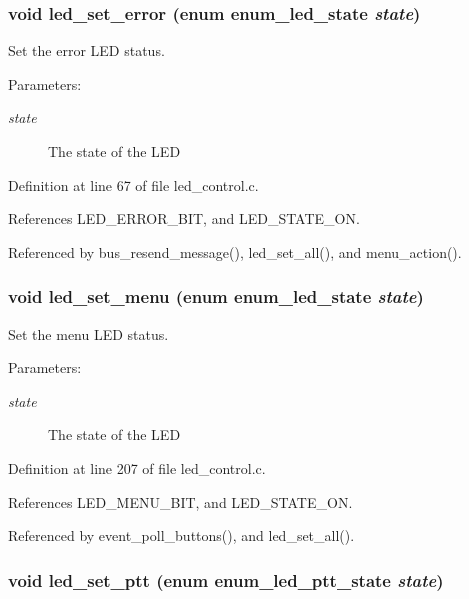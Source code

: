\subsubsection[{led\_\-set\_\-error}]{\setlength{\rightskip}{0pt plus 5cm}void led\_\-set\_\-error (enum {\bf enum\_\-led\_\-state} {\em state})}\label{led__control_8h_193a3938c3c5250e16f71f66d60dc5c7}


Set the error LED status. 

\begin{Desc}
\item[Parameters:]
\begin{description}
\item[{\em state}]The state of the LED \end{description}
\end{Desc}


Definition at line 67 of file led\_\-control.c.

References LED\_\-ERROR\_\-BIT, and LED\_\-STATE\_\-ON.

Referenced by bus\_\-resend\_\-message(), led\_\-set\_\-all(), and menu\_\-action().
\subsubsection[{led\_\-set\_\-menu}]{\setlength{\rightskip}{0pt plus 5cm}void led\_\-set\_\-menu (enum {\bf enum\_\-led\_\-state} {\em state})}\label{led__control_8h_f3e320269d62c70597b7d7eb457cb29e}


Set the menu LED status. 

\begin{Desc}
\item[Parameters:]
\begin{description}
\item[{\em state}]The state of the LED \end{description}
\end{Desc}


Definition at line 207 of file led\_\-control.c.

References LED\_\-MENU\_\-BIT, and LED\_\-STATE\_\-ON.

Referenced by event\_\-poll\_\-buttons(), and led\_\-set\_\-all().
\subsubsection[{led\_\-set\_\-ptt}]{\setlength{\rightskip}{0pt plus 5cm}void led\_\-set\_\-ptt (enum {\bf enum\_\-led\_\-ptt\_\-state} {\em state})}\label{led__control_8h_995815f6cfca1616b4bbec84ba4bc27c}


